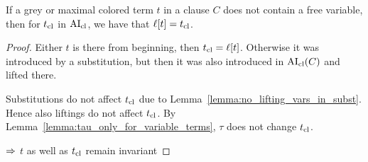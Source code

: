 \documentclass[,%
	paper=a4,%
	DIV12, %
	twoside=false,%
	liststotoc,
	bibtotoc,
	draft=false,%
	numbers=noendperiod
]{scrartcl}
\begin{document}
\begin{lemma}
	\label{lemma:jka5a5halat}
	If a grey or maximal colored term $t$ in a clause $C$ does not contain a free variable, then for $t_\mathrm{cl}$ in $\operatorname{AI}_\mathrm{cl}$, we have that $\ell[t]=t_\mathrm{cl}$. 
\end{lemma}
\begin{proof}
	Either $t$ is there from beginning, then $t_\mathrm{cl} = \ell[t]$.
	Otherwise it was introduced by a substitution, but then it was also introduced in $\operatorname{AI}_\mathrm{cl}(C)$ and lifted there.

	Substitutions do not affect $t_\mathrm{cl}$ due to Lemma~\ref{lemma:no_lifting_vars_in_subst}.
	Hence also liftings do not affect $t_\mathrm{cl}$.
	By Lemma~\ref{lemma:tau_only_for_variable_terms}, $\tau$ does not change $t_\mathrm{cl}$.

	$\Rightarrow$ $t$ as well as $t_\mathrm{cl}$ remain invariant
\end{proof}
\end{document}
